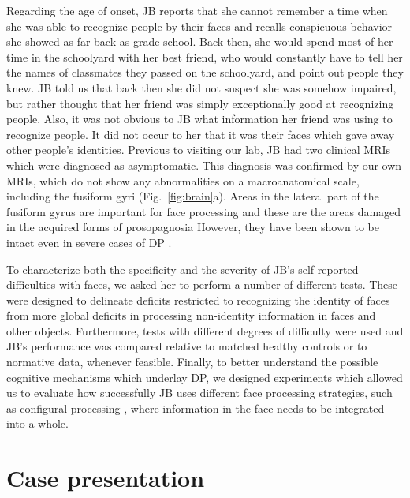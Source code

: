 \documentclass[fleqn,10pt]{SelfArx} %
\begin{document}
Regarding the age of onset, JB reports that she cannot remember a time when she was able to recognize people by their faces and recalls conspicuous behavior she showed as far back as grade school. Back then, she would spend most of her time in the schoolyard with her best friend, who would constantly have to tell her the names of classmates they passed on the schoolyard, and point out people they knew. JB told us that back then she did not suspect she was somehow impaired, but rather thought that her friend was simply exceptionally good at recognizing people. Also, it was not obvious to JB what information her friend was using to recognize people. It did not occur to her that it was their faces which gave away other people's identities.
Previous to visiting our lab, JB had two clinical MRIs which were diagnosed as asymptomatic. This diagnosis was confirmed by our own MRIs, which do not show any abnormalities on a macroanatomical scale, including the fusiform gyri (Fig.~\ref{fig:brain}a). Areas in the lateral part of the fusiform gyrus are important for face processing \citep{Grill_Spector_2014} and these are the areas damaged in the acquired forms of prosopagnosia \citep{Damasio_1982} However, they have been shown to be intact even in severe cases of DP \citep{De_Haan_1991, de_Gelder_2000, Nunn_2001, Jones_2001}.

To characterize both the specificity and the severity of JB's self-reported difficulties with faces, we asked her to perform a number of different tests. These were designed to delineate deficits restricted to recognizing the identity of faces from more global deficits in processing non-identity information in faces and other objects. Furthermore, tests with different degrees of difficulty were used and JB's performance was compared relative to matched healthy controls or to normative data, whenever feasible. Finally, to better understand the possible cognitive mechanisms which underlay DP, we designed experiments which allowed us to evaluate how successfully JB uses different face processing strategies, such as configural processing \citep{Maurer_2002}, where information in the face needs to be integrated into a whole.

\section{Case presentation}
\end{document}
